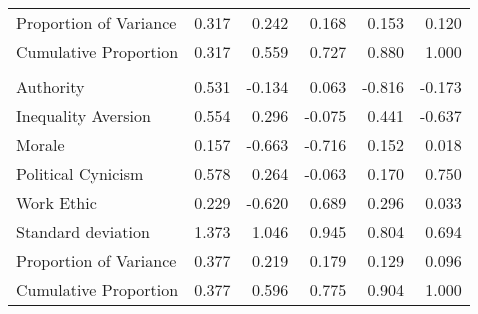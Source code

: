\begin{tabular}{lrrrrr}
\hspace{1em}Proportion of Variance & 0.317 & 0.242 & 0.168 & 0.153 & 0.120\\
\hspace{1em}Cumulative Proportion & 0.317 & 0.559 & 0.727 & 0.880 & 1.000\\
\addlinespace[0.3em]
\multicolumn{6}{l}{\textbf{Age 50}}\\
\hline
\hspace{1em}Authority & 0.531 & -0.134 & 0.063 & -0.816 & -0.173\\
\hspace{1em}Inequality Aversion & 0.554 & 0.296 & -0.075 & 0.441 & -0.637\\
\hspace{1em}Morale & 0.157 & -0.663 & -0.716 & 0.152 & 0.018\\
\hspace{1em}Political Cynicism & 0.578 & 0.264 & -0.063 & 0.170 & 0.750\\
\hspace{1em}Work Ethic & 0.229 & -0.620 & 0.689 & 0.296 & 0.033\\
\midrule
\hspace{1em}Standard deviation & 1.373 & 1.046 & 0.945 & 0.804 & 0.694\\
\hspace{1em}Proportion of Variance & 0.377 & 0.219 & 0.179 & 0.129 & 0.096\\
\hspace{1em}Cumulative Proportion & 0.377 & 0.596 & 0.775 & 0.904 & 1.000\\
\bottomrule
\end{tabular}
